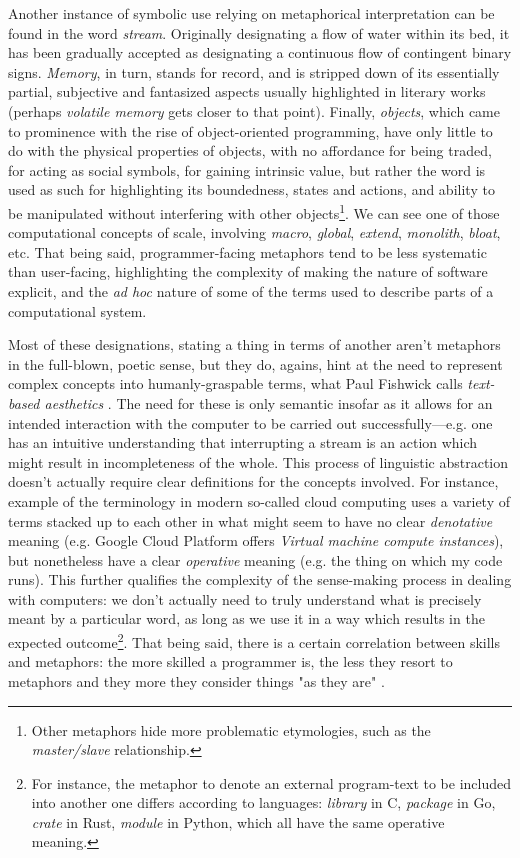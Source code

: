 Another instance of symbolic use relying on metaphorical interpretation can be found in the word \emph{stream}. Originally designating a flow of water within its bed, it has been gradually accepted as designating a continuous flow of contingent binary signs. \emph{Memory}, in turn, stands for record, and is stripped down of its essentially partial, subjective and fantasized aspects usually highlighted in literary works (perhaps \emph{volatile memory} gets closer to that point). Finally, \emph{objects}, which came to prominence with the rise of object-oriented programming, have only little to do with the physical properties of objects, with no affordance for being traded, for acting as social symbols, for gaining intrinsic value, but rather the word is used as such for highlighting its boundedness, states and actions, and ability to be manipulated without interfering with other objects\footnote{Other metaphors hide more problematic etymologies, such as the \emph{master/slave} relationship.}. We can see one of those computational concepts of scale, involving \emph{macro}, \emph{global}, \emph{extend}, \emph{monolith}, \emph{bloat}, etc. That being said, programmer-facing metaphors tend to be less systematic than user-facing, highlighting the complexity of making the nature of software explicit, and the \emph{ad hoc} nature of some of the terms used to describe parts of a computational system.

Most of these designations, stating a thing in terms of another aren't metaphors in the full-blown, poetic sense, but they do, agains, hint at the need to represent complex concepts into humanly-graspable terms, what Paul Fishwick calls \emph{text-based aesthetics} \citep{fishwick_aesthetic_2006a}. The need for these is only semantic insofar as it allows for an intended interaction with the computer to be carried out successfully—e.g. one has an intuitive understanding that interrupting a stream is an action which might result in incompleteness of the whole. This process of linguistic abstraction doesn't actually require clear definitions for the concepts involved. For instance, example of the terminology in modern so-called cloud computing uses a variety of terms stacked up to each other in what might seem to have no clear \emph{denotative} meaning (e.g. Google Cloud Platform offers \emph{Virtual machine compute instances}), but nonetheless have a clear \emph{operative} meaning (e.g. the thing on which my code runs). This further qualifies the complexity of the sense-making process in dealing with computers: we don't actually need to truly understand what is precisely meant by a particular word, as long as we use it in a way which results in the expected outcome\footnote{For instance, the metaphor to denote an external program-text to be included into another one differs according to languages: \emph{library} in C, \emph{package} in Go, \emph{crate} in Rust, \emph{module} in Python, which all have the same operative meaning.}. That being said, there is a certain correlation between skills and metaphors: the more skilled a programmer is, the less they resort to metaphors and they more they consider things "as they are" \citep{mckeithen_knowledge_1981}.

